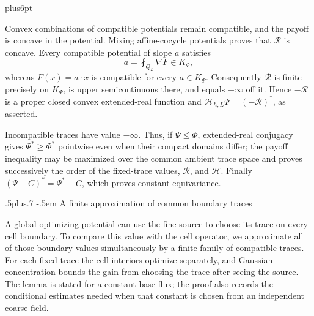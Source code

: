 \documentclass[11pt,reqno]{amsart}
\makeatletter
\def\subsection{\@startsection{subsection}{2}{0pt}%
  {.5\linespacing plus.7\linespacing}
  {-.5em}
  {\normalfont\scshape}}
\theoremstyle{plain}
\theoremstyle{definition}
\theoremstyle{remark}
\renewenvironment{proof}[1][\proofname]{%
  \par
  \pushQED{\qed}%
  \normalfont
  \topsep6pt plus6pt\relax
  \trivlist
  \item[\hskip\labelsep\slshape #1\@addpunct{.}]%
  \ignorespaces
}{%
  \popQED
  \endtrivlist
  \@endpefalse
}
\DeclareRobustCommand{\qed}{%
  \leavevmode\unskip\penalty9999\hbox{}\nobreak
  \ifmmode
    \makebox[0pt][l]{\qquad\hbox{\qedsymbol}}%
  \else
    \qquad\hbox{\qedsymbol}%
  \fi
}
\renewcommand{\qedsymbol}{\rule[.47pt]{4pt}{6pt}}
\numberwithin{equation}{section}
\newcommand{\1}{\mathbf 1}
\makeatother
\begin{document}
\begin{proof}
Convex combinations of compatible potentials remain compatible, and
the payoff is concave in the potential.  Mixing affine-cocycle
potentials proves that $\mathcal R$ is concave.  Every compatible potential of
slope $a$ satisfies
\begin{equation*}
a=\fint_ {Q_ L}\nabla F\in K_ \Psi,
\end{equation*}
whereas $F(x)=a\cdot x$ is compatible for every $a\in K_ \Psi$.
Consequently $\mathcal R$ is finite precisely on $K_ \Psi$, is
upper semicontinuous there, and equals $-\infty$ off it.  Hence
$-\mathcal R$ is a proper closed convex extended-real function and
$\mathcal H_ {h,L}\Psi=(-\mathcal R)^*$, as asserted.

Incompatible traces have value $-\infty$.  Thus, if
$\Psi\leq\Phi$, extended-real conjugacy gives
$\Psi^*\geq\Phi^*$ pointwise even when their compact domains differ;
the payoff inequality may be maximized over the common ambient trace
space and proves successively the order of the fixed-trace values,
$\mathcal R$, and $\mathcal H$.  Finally
$(\Psi+C)^*=\Psi^*-C$, which proves constant equivariance.

\end{proof}

\subsection{A finite approximation of common boundary traces}

A global optimizing potential can use the fine source to choose its trace
on every cell boundary.  To compare this value with the cell operator,
we approximate all of those boundary values simultaneously by a finite
family of compatible traces.  For each fixed trace the cell interiors
optimize separately, and Gaussian concentration bounds the gain from
choosing the trace after seeing the source.  The lemma is stated for a
constant base flux; the proof also records the conditional estimates
needed when that constant is chosen from an independent coarse field.
\end{document}
